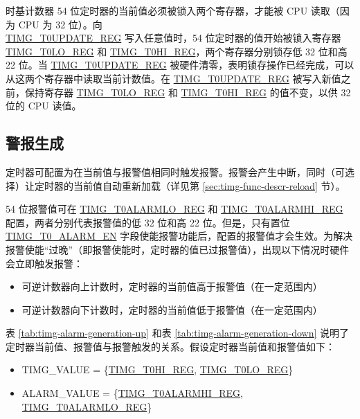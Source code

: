 \documentclass[main\_\_CN.tex]{subfiles}
\begin{document}
时基计数器 54 位定时器的当前值必须被锁入两个寄存器，才能被 CPU 读取（因为 CPU 为 32 位）。向 \\\hyperref[regdesc:TIMGTXUPDATEREG]{TIMG\_T0UPDATE\_REG} 写入任意值时，54 位定时器的值开始被锁入寄存器 \hyperref[regdesc:TIMGTXLOREG]{TIMG\_T0LO\_REG} 和 \hyperref[regdesc:TIMGTXHIREG]{TIMG\_T0HI\_REG}，两个寄存器分别锁存低 32 位和高 22 位。当 \hyperref[regdesc:TIMGTXUPDATEREG]{TIMG\_T0UPDATE\_REG} 被硬件清零，表明锁存操作已经完成，可以从这两个寄存器中读取当前计数值。在 \hyperref[regdesc:TIMGTXUPDATEREG]{TIMG\_T0UPDATE\_REG} 被写入新值之前，保持寄存器 \hyperref[regdesc:TIMGTXLOREG]{TIMG\_T0LO\_REG} 和 \hyperref[regdesc:TIMGTXHIREG]{TIMG\_T0HI\_REG} 的值不变，以供 32 位的 CPU 读值。

\subsection{警报生成}

定时器可配置为在当前值与报警值相同时触发报警。报警会产生中断，同时（可选择）让定时器的当前值自动重新加载（详见第 \ref{sec:timg-func-descr-reload} 节）。

54 位报警值可在 \hyperref[regdesc:TIMGTXALARMLOREG]{TIMG\_T0ALARMLO\_REG} 和 \hyperref[regdesc:TIMGTXALARMHIREG]{TIMG\_T0ALARMHI\_REG} 配置，两者分别代表报警值的低 32 位和高 22 位。但是，只有置位 \hyperref[fielddesc:TIMGTXALARMEN]{TIMG\_T0\_ALARM\_EN} 字段使能报警功能后，配置的报警值才会生效。为解决报警使能“过晚”（即报警使能时，定时器的值已过报警值），出现以下情况时硬件会立即触发报警：

\begin{itemize}
    \item 可逆计数器向上计数时，定时器的当前值高于报警值（在一定范围内）
    \item 可逆计数器向下计数时，定时器的当前值低于报警值（在一定范围内）
\end{itemize}

表 \ref{tab:timg-alarm-generation-up} 和表 \ref{tab:timg-alarm-generation-down} 说明了定时器当前值、报警值与报警触发的关系。假设定时器当前值和报警值如下：

\begin{itemize}
    \item TIMG\_VALUE = \{\hyperref[regdesc:TIMGTXHIREG]{TIMG\_T0HI\_REG}, \hyperref[regdesc:TIMGTXLOREG]{TIMG\_T0LO\_REG}\}
    \item ALARM\_VALUE = \{\hyperref[regdesc:TIMGTXALARMHIREG]{TIMG\_T0ALARMHI\_REG}, \hyperref[regdesc:TIMGTXALARMLOREG]{TIMG\_T0ALARMLO\_REG}\}
\end{itemize}
\end{document}
